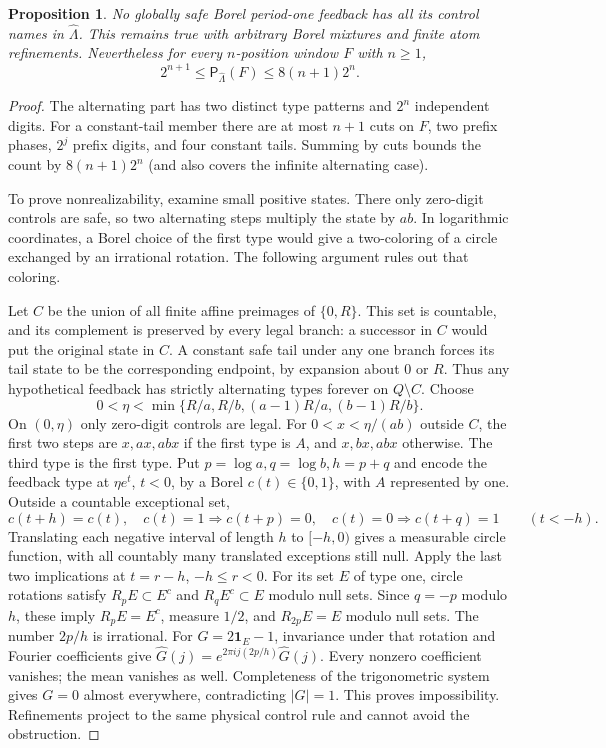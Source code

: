 \documentclass[11pt,reqno]{amsart}
\numberwithin{equation}{section}
\newtheorem{proposition}[theorem]{Proposition}
\theoremstyle{definition}
\theoremstyle{definition}
\newcommand{\Patt}{\mathsf P}
\newcommand{\one}{\mathbf 1}
\begin{document}
\begin{proposition}\label{prop:alternation}
No globally safe Borel period-one feedback has all its control names
in $\widehat\Lambda$. This remains true with arbitrary Borel
mixtures and finite atom refinements. Nevertheless for every
$n$-position window $F$ with $n\ge1$,
\[
 2^{n+1}\le\Patt_{\widehat\Lambda}(F)\le8(n+1)2^n.
\]
\end{proposition}
\begin{proof}
The alternating part has two distinct type patterns and $2^n$
independent digits. For a constant-tail member there are at most
$n+1$ cuts on $F$, two prefix phases, $2^j$ prefix digits, and
four constant tails. Summing by cuts bounds the count by
$8(n+1)2^n$ (and also covers the infinite alternating case).

To prove nonrealizability, examine small positive states. There only
zero-digit controls are safe, so two alternating steps multiply the
state by $ab$. In logarithmic coordinates, a Borel choice of the first
type would give a two-coloring of a circle exchanged by an irrational
rotation. The following argument rules out that coloring.

Let $C$ be the union of all finite affine
preimages of $\{0,R\}$. This set is countable, and its complement is preserved by every
legal branch: a successor in $C$ would put the original state in $C$. A constant safe tail under any one
branch forces its tail state to be the corresponding endpoint,
by expansion about $0$ or $R$. Thus any hypothetical feedback
has strictly alternating types forever on $Q\setminus C$.
Choose
\[
 0<\eta<\min\{R/a,R/b,(a-1)R/a,(b-1)R/b\}.
\]
On $(0,\eta)$ only zero-digit controls are legal. For
$0<x<\eta/(ab)$ outside $C$, the first two steps are
$x,ax,abx$ if the first type is $A$, and $x,bx,abx$ otherwise.
The third type is the first type. Put $p=\log a,q=\log b,h=p+q$
and encode the feedback type at $\eta e^t$, $t<0$, by a Borel
$c(t)\in\{0,1\}$, with $A$ represented by one. Outside a
countable exceptional set,
\[
 c(t+h)=c(t),\quad
 c(t)=1\Rightarrow c(t+p)=0,\quad
 c(t)=0\Rightarrow c(t+q)=1\qquad(t<-h).
\]
Translating each negative interval of length $h$ to $[-h,0)$
gives a measurable circle function, with all countably many
translated exceptions still null. Apply the last two implications
at $t=r-h$, $-h\le r<0$. For its set $E$ of type one, circle
rotations satisfy $R_pE\subset E^c$ and $R_qE^c\subset E$
modulo null sets. Since $q=-p$ modulo $h$, these imply
$R_pE=E^c$, measure $1/2$, and $R_{2p}E=E$ modulo null sets.
The number $2p/h$ is irrational. For
$G=2\one_E-1$, invariance under that rotation and Fourier
coefficients give
$\widehat G(j)=e^{2\pi i j(2p/h)}\widehat G(j)$.
Every nonzero coefficient vanishes; the mean vanishes as well.
Completeness of the trigonometric system gives $G=0$ almost
everywhere, contradicting $|G|=1$. This proves impossibility.
Refinements project to the same physical control rule and cannot
avoid the obstruction.
\end{proof}
\end{document}
